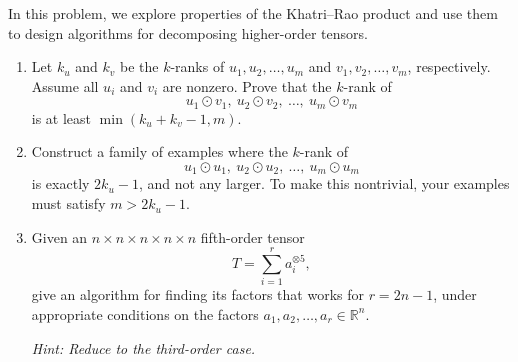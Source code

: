 \documentclass[12pt]{article}
\theoremstyle{plain}
\theoremstyle{definition}
\begin{document}
In this problem, we explore properties of the Khatri--Rao product
and use them to design algorithms for decomposing higher-order tensors.

\begin{enumerate}
    \item[(a)]
    Let \(k_u\) and \(k_v\) be the \(k\)-ranks of
    \(u_1,u_2,\ldots,u_m\) and \(v_1,v_2,\ldots,v_m\), respectively. Assume all $u_i$ and $v_i$ are nonzero.
    Prove that the \(k\)-rank of
    \[
    u_1 \odot v_1,\ u_2 \odot v_2,\ \ldots,\ u_m \odot v_m
    \]
    is at least \(\min(k_u+k_v-1,m)\).

    \item[(b)]
    Construct a family of examples where the \(k\)-rank of
    \[
    u_1 \odot u_1,\ u_2 \odot u_2,\ \ldots,\ u_m \odot u_m
    \]
    is exactly \(2k_u-1\), and not any larger.
    To make this nontrivial, your examples must satisfy
    \(m>2k_u-1\).

    \item[(c)]
    Given an \(n \times n \times n \times n \times n\)
    fifth-order tensor
    \[
    T = \sum_{i=1}^{r} a_i^{\otimes 5},
    \]
    give an algorithm for finding its factors that works for
    \(r=2n-1\), under appropriate conditions on the factors
    \(a_1,a_2,\ldots,a_r \in \mathbb{R}^n\).

    \emph{Hint: Reduce to the third-order case.}
\end{enumerate}
\end{document}
